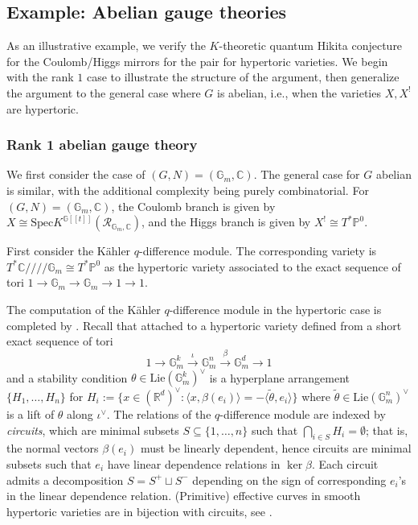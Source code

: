 \documentclass[reqno]{amsart}
\numberwithin{equation}{section}
\numberwithin{equation}{section}
\numberwithin{equation}{section}
\theoremstyle{definition}
\theoremstyle{remark}
\theoremstyle{remark}
\begin{document}
\subsection{Example: Abelian gauge theories}\label{ssec:quantumHikita-proof}
As an illustrative example, we verify the $K$-theoretic quantum Hikita conjecture for the Coulomb/Higgs mirrors for the pair for hypertoric varieties. We begin with the rank $1$ case to illustrate the structure of the argument, then generalize the argument to the general case where $G$ is abelian, i.e., when the varieties $X, X^!$ are hypertoric.

\subsubsection{Rank 1 abelian gauge theory}

We first consider the case of $(G, N) = (\mathbb{G}_m, \mathbb{C})$. The general case for $G$ abelian is similar, with the additional complexity being purely combinatorial. For $(G,N) =  (\mathbb{G}_m, \mathbb{C})$, the Coulomb branch is given by $X \cong \mathrm{Spec} K^{\mathbb{G}[\![t]\!]} (\mathcal{R}_{\mathbb{G}_m, \mathbb{C}})$, and the Higgs branch is given by $X^! \cong T^*\mathbb{P}^0$.

First consider the K\"ahler $q$-difference module. The corresponding variety is $T^*\mathbb{C}/\!\!/\!\!/\!\!/ \mathbb{G}_m \cong T^*\mathbb{P}^0$ as the hypertoric variety associated to the exact sequence of tori $1 \to \mathbb{G}_m \to \mathbb{G}_m \to 1 \to 1$. 

The computation of the K\"ahler $q$-difference module in the hypertoric case is completed by \cite{smirnov-zhou}. Recall that attached to a hypertoric variety defined from a short exact sequence of tori
\begin{equation}
    1 \to \mathbb{G}_m^k \overset{\iota}{\to} \mathbb{G}_m^n \overset{\beta}{\to} \mathbb{G}_m^d \to 1
\end{equation}
and a stability condition $\theta \in \mathrm{Lie}(\mathbb{G}_m^k)^\vee$ is a hyperplane arrangement $\{ H_1, \dots, H_n\}$ for $H_i := \{ x \in (\mathbb{R}^d)^\vee : \langle x, \beta(e_i) \rangle = - \langle \widetilde{\theta} , e_i \rangle \}$ where $\widetilde{\theta} \in \mathrm{Lie}(\mathbb{G}_m^n)^\vee$ is a lift of $\theta$ along $\iota^\vee$. The relations of the $q$-difference module are indexed by \emph{circuits}, which are minimal subsets $S \subseteq \{1, \dots, n\}$ such that $\bigcap_{i \in S} H_i = \emptyset$; that is, the normal vectors $\beta(e_i)$ must be linearly dependent, hence circuits are minimal subsets such that $e_i$ have linear dependence relations in $\ker \beta$. Each circuit admits a decomposition $S = S^+ \sqcup S^-$ depending on the sign of corresponding $e_i$'s in the linear dependence relation. (Primitive) effective curves in smooth hypertoric varieties are in bijection with circuits, see \cite[Section 2.5]{smirnov-zhou}.
\end{document}
